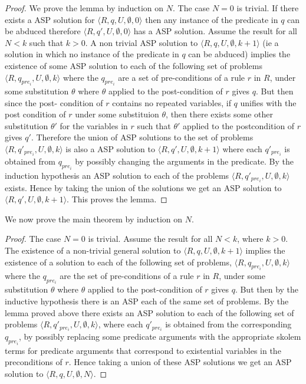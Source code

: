 \begin{proof}
We prove the lemma by induction on $N$.
The case $N = 0$ is trivial. If there exists a ASP solution for $\langle
R,q,U,\emptyset,0\rangle$ then any instance of the predicate in $q$ can be
abduced therefore $\langle R,q',U,\emptyset,0\rangle$ has a ASP solution. Assume
the result for all $N<k$ such that $k>0$. A non trivial ASP solution to
$\langle R,q,U,\emptyset,k+1\rangle$ (ie a solution in which no instance of the predicate in $q$ can be abduced) implies the existence of some ASP solution to
each of the following set of problems $\langle R,q_{pre_{i}},U,\emptyset,k\rangle$
where the $q_{pre_{i}}$ are a set of
pre-conditions of a rule $r$ in $R$, under some substitution $\theta$ where
$\theta$ applied to the post-condition of $r$ gives $q$. But then since the post- condition of $r$
contains no repeated variables, if $q$ unifies with the post condition of $r$
under some substituion $\theta$, then there exists some other substitution
$\theta'$ for the variables in $r$ such that $\theta'$ applied to the
postcondition of $r$ gives $q'$. Therefore the union of ASP solutions to the set of problems
$\langle R,q'_{pre_{i}},U,\emptyset,k\rangle$ is also a ASP solution to $\langle
R,q',U,\emptyset,k+1\rangle$ where each $q'_{pre_{i}}$ is obtained from
$q_{pre_{i}}$ by possibly changing the arguments in the predicate. By the
induction hypothesis an ASP solution to each of the problems $\langle
R,q'_{pre_{i}},U,\emptyset,k\rangle$ exists. Hence by taking the union of the solutions we get an ASP solution to  $\langle
R,q',U,\emptyset,k+1\rangle$. This proves the lemma.
\end{proof}

We now prove the main theorem by induction on $N$. 

\begin{proof}
The case $N=0$ is trivial. Assume
the result for all $N<k$, where $k>0$. The existence of a non-trivial general solution
to $\langle R,q,U,\emptyset,k+1\rangle$ implies the existence of a solution to each of the following set of problems, $\langle R,q_{pre_{i}},U,\emptyset,k\rangle$ where the $q_{pre_{i}}$ are the set of
pre-conditions of a rule $r$ in $R$, under some substitution $\theta$ where
$\theta$ applied to the post-condition of $r$ gives $q$. But then by the
inductive hypothesis there is an ASP each of the same set of problems. By
the lemma proved above there exists an ASP solution to each of the following set of
problems $\langle R,q'_{pre_{i}},U,\emptyset,k\rangle$, where each
$q'_{pre_{i}}$ is obtained from the corresponding $q_{pre_{i}}$, by possibly
replacing some predicate arguments with the appropriate skolem terms for
predicate arguments that correspond to existential variables in the
preconditions of $r$. Hence taking a union of these ASP solutions we get an ASP solution to
$\langle R,q,U,\emptyset,N\rangle$.
\end{proof}






